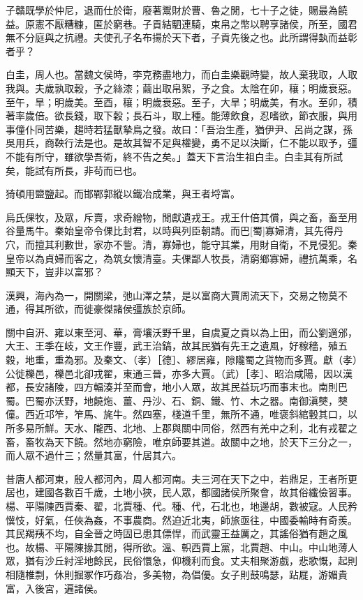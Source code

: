 \begin{pinyinscope}
子贛既學於仲尼，退而仕於衛，廢著鬻財於曹、魯之閒，七十子之徒，賜最為饒益。原憲不厭糟糠，匿於窮巷。子貢結駟連騎，束帛之幣以聘享諸侯，所至，國君無不分庭與之抗禮。夫使孔子名布揚於天下者，子貢先後之也。此所謂得埶而益彰者乎？

白圭，周人也。當魏文侯時，李克務盡地力，而白圭樂觀時變，故人棄我取，人取我與。夫歲孰取穀，予之絲漆；繭出取帛絮，予之食。太陰在卯，穰；明歲衰惡。至午，旱；明歲美。至酉，穰；明歲衰惡。至子，大旱；明歲美，有水。至卯，積著率歲倍。欲長錢，取下穀；長石斗，取上種。能薄飲食，忍嗜欲，節衣服，與用事僮仆同苦樂，趨時若猛獸摯鳥之發。故曰：「吾治生產，猶伊尹、呂尚之謀，孫吳用兵，商鞅行法是也。是故其智不足與權變，勇不足以決斷，仁不能以取予，彊不能有所守，雖欲學吾術，終不告之矣。」蓋天下言治生祖白圭。白圭其有所試矣，能試有所長，非茍而已也。

猗頓用盬鹽起。而邯鄲郭縱以鐵冶成業，與王者埒富。

烏氏倮牧，及眾，斥賣，求奇繒物，閒獻遺戎王。戎王什倍其償，與之畜，畜至用谷量馬牛。秦始皇帝令倮比封君，以時與列臣朝請。而巴[蜀]寡婦清，其先得丹穴，而擅其利數世，家亦不訾。清，寡婦也，能守其業，用財自衛，不見侵犯。秦皇帝以為貞婦而客之，為筑女懷清臺。夫倮鄙人牧長，清窮鄉寡婦，禮抗萬乘，名顯天下，豈非以富邪？

漢興，海內為一，開關梁，弛山澤之禁，是以富商大賈周流天下，交易之物莫不通，得其所欲，而徙豪傑諸侯彊族於京師。

關中自汧、雍以東至河、華，膏壤沃野千里，自虞夏之貢以為上田，而公劉適邠，大王、王季在岐，文王作豐，武王治鎬，故其民猶有先王之遺風，好稼穡，殖五穀，地重，重為邪。及秦文、（孝）［德］、繆居雍，隙隴蜀之貨物而多賈。獻（孝）公徙櫟邑，櫟邑北卻戎翟，東通三晉，亦多大賈。（武）［孝］、昭治咸陽，因以漢都，長安諸陵，四方輻湊并至而會，地小人眾，故其民益玩巧而事末也。南則巴蜀。巴蜀亦沃野，地饒炧、薑、丹沙、石、銅、鐵、竹、木之器。南御滇僰，僰僮。西近邛笮，笮馬、旄牛。然四塞，棧道千里，無所不通，唯褒斜綰轂其口，以所多易所鮮。天水、隴西、北地、上郡與關中同俗，然西有羌中之利，北有戎翟之畜，畜牧為天下饒。然地亦窮險，唯京師要其道。故關中之地，於天下三分之一，而人眾不過什三；然量其富，什居其六。

昔唐人都河東，殷人都河內，周人都河南。夫三河在天下之中，若鼎足，王者所更居也，建國各數百千歲，土地小狹，民人眾，都國諸侯所聚會，故其俗纖儉習事。楊、平陽陳西賈秦、翟，北賈種、代。種、代，石北也，地邊胡，數被寇。人民矜懻忮，好氣，任俠為姦，不事農商。然迫近北夷，師旅亟往，中國委輸時有奇羨。其民羯羠不均，自全晉之時固已患其僄悍，而武靈王益厲之，其謠俗猶有趙之風也。故楊、平陽陳掾其閒，得所欲。溫、軹西賈上黨，北賈趙、中山。中山地薄人眾，猶有沙丘紂淫地餘民，民俗懁急，仰機利而食。丈夫相聚游戲，悲歌慨，起則相隨椎剽，休則掘冢作巧姦冶，多美物，為倡優。女子則鼓鳴瑟，跕屣，游媚貴富，入後宮，遍諸侯。


\end{pinyinscope}

